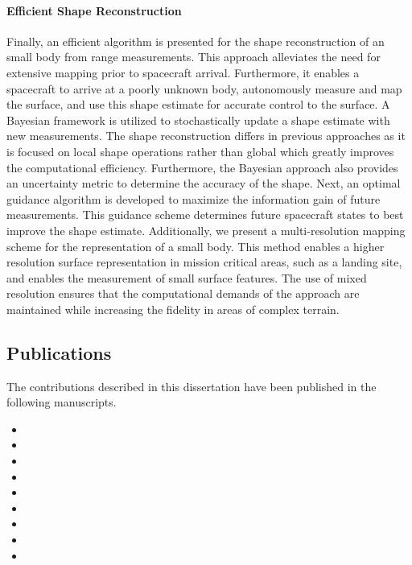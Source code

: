 \paragraph{Efficient Shape Reconstruction}
Finally, an efficient algorithm is presented for the shape reconstruction of an small body from range measurements. 
This approach alleviates the need for extensive mapping prior to spacecraft arrival. 
Furthermore, it enables a spacecraft to arrive at a poorly unknown body, autonomously measure and map the surface, and use this shape estimate for accurate control to the surface.
A Bayesian framework is utilized to stochastically update a shape estimate with new measurements.
The shape reconstruction differs in previous approaches as it is focused on local shape operations rather than global which greatly improves the computational efficiency.
Furthermore, the Bayesian approach also provides an uncertainty metric to determine the accuracy of the shape.
Next, an optimal guidance algorithm is developed to maximize the information gain of future measurements.
This guidance scheme determines future spacecraft states to best improve the shape estimate. 
Additionally, we present a multi-resolution mapping scheme for the representation of a small body.
This method enables a higher resolution surface representation in mission critical areas, such as a landing site, and enables the measurement of small surface features.
The use of mixed resolution ensures that the computational demands of the approach are maintained while increasing the fidelity in areas of complex terrain.

\subsection{Publications}

The contributions described in this dissertation have been published in the following manuscripts.


\begin{itemize}
    \item {}
    \item {}
    \item {}
    \item {}
    \item {}
    \item {}
    \item {}
    \item {}
    \item {}
\end{itemize}

